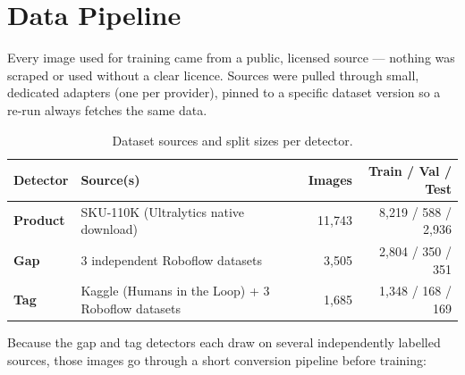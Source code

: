 \documentclass[11pt,a4paper]{article}
\begin{document}
\section{Data Pipeline}

Every image used for training came from a public, licensed source --- nothing was scraped or
used without a clear licence. Sources were pulled through small, dedicated adapters (one per
provider), pinned to a specific dataset version so a re-run always fetches the same data.

\begin{table}[h]
\centering
\renewcommand{\arraystretch}{1.3}
\begin{tabular}{@{}l l r r@{}}
\toprule
\textbf{Detector} & \textbf{Source(s)} & \textbf{Images} & \textbf{Train / Val / Test} \\
\midrule
\textcolor{brandamber}{\textbf{Product}} & SKU-110K (Ultralytics native download) & 11{,}743 & 8{,}219 / 588 / 2{,}936 \\
\textcolor{brandgap}{\textbf{Gap}} & 3 independent Roboflow datasets & 3{,}505 & 2{,}804 / 350 / 351 \\
\textcolor{brandtag}{\textbf{Tag}} & Kaggle (Humans in the Loop) + 3 Roboflow datasets & 1{,}685 & 1{,}348 / 168 / 169 \\
\bottomrule
\end{tabular}
\caption{Dataset sources and split sizes per detector.}
\end{table}

Because the gap and tag detectors each draw on several independently labelled sources, those
images go through a short conversion pipeline before training:
\end{document}
